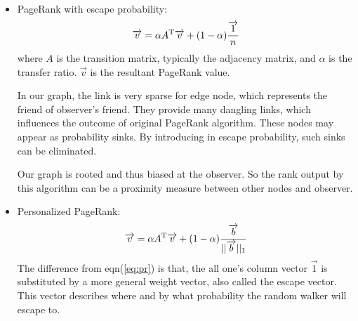 \documentclass[11pt,a4paper]{article}
\begin{document}
		\begin{itemize}
			\item PageRank with escape probability:
			\begin{equation}
				\overrightarrow{v} = \alpha A^{\rm T}\overrightarrow{v}
				+ (1-\alpha)\frac{\overrightarrow{1}}{n}
				\label{eq:pr}
			\end{equation}
			where $A$ is the transition matrix, typically the adjacency matrix,
			and $\alpha$ is the transfer ratio. $ \overrightarrow{v} $ is 
			the resultant PageRank value. 
			
			In our graph, the link is very sparse for edge node, which 
			represents the friend of observer's friend. They provide 
			many dangling links, which influences the outcome of 
			original PageRank algorithm. These nodes may appear as probability
			sinks. By introducing in escape probability, such sinks can be eliminated. 
			
			Our graph is rooted and thus biased at the observer. So the
			rank output by this algorithm can be a proximity 
			measure between other nodes and observer. 
			
			\item Personalized PageRank:
			\begin{equation}
				\overrightarrow{v} = \alpha A^{\rm T}\overrightarrow{v}
				+ (1-\alpha)\frac{\overrightarrow{b}}{||\overrightarrow{b}||_1}
				\label{eq:ppr}
			\end{equation}
			The difference from eqn(\ref{eq:pr}) is that, the all one's column vector 
			$\overrightarrow{1}$ is 
			substituted by a more general weight vector, also called the 
			escape vector. This vector describes where and by what probability 
			the random walker will escape to. 		
			

\end{itemize}
\end{document}
